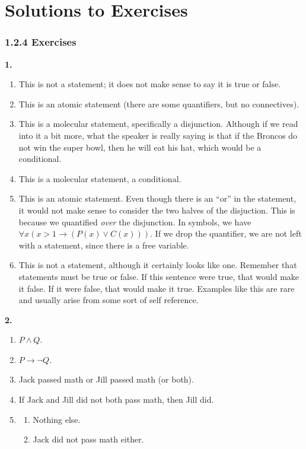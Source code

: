 \documentclass[10pt,]{book}
\theoremstyle{plain}
\theoremstyle{definition}
\theoremstyle{definition}
\theoremstyle{definition}
\numberwithin{equation}{section}
\def\imp{\rightarrow}
\begin{document}
\chapter[Solutions to Exercises]{Solutions to Exercises}\label{appendix-1}
\subsection*{1.2.4 Exercises}
\noindent\textbf{1.}\quad{}\leavevmode%
\begin{enumerate}[label=(\alph*)]
\item\hypertarget{li-67}{}This is not a statement; it does not make sense to say it is true or false.%
\item\hypertarget{li-68}{}This is an atomic statement (there are some quantifiers, but no connectives).%
\item\hypertarget{li-69}{}This is a molecular statement, specifically a disjunction.  Although if we read into it a bit more, what the speaker is really saying is that if the Broncos do not win the super bowl, then he will eat his hat, which would be a conditional.%
\item\hypertarget{li-70}{}This is a molecular statement, a conditional.%
\item\hypertarget{li-71}{}This is an atomic statement.  Even though there is an ``or'' in the statement, it would not make sense to consider the two halves of the disjuction.  This is because we quantified \emph{over} the disjunction.  In symbols, we have \(\forall x (x > 1 \imp (P(x) \vee C(x)))\).  If we drop the quantifier, we are not left with a statement, since there is a free variable.%
\item\hypertarget{li-72}{}This is not a statement, although it certainly looks like one.  Remember that statements must be true or false.  If this sentence were true, that would make it false.  If it were false, that would make it true.  Examples like this are rare and usually arise from some sort of self reference.%
\end{enumerate}
\par\smallskip
\noindent\textbf{2.}\quad{}\leavevmode%
\begin{enumerate}[label=(\alph*)]
\item\hypertarget{li-80}{}\(P \wedge Q\).%
\item\hypertarget{li-81}{}\(P \imp \neg Q\).%
\item\hypertarget{li-82}{}
    Jack passed math or Jill passed math (or both).
\item\hypertarget{li-83}{}
    If Jack and Jill did not both pass math, then Jill did.
\item\hypertarget{li-84}{}
\begin{enumerate}[label=\roman*.]
\item\hypertarget{li-85}{} Nothing else. %
\item\hypertarget{li-86}{} Jack did not pass math either.%
\end{enumerate}

\end{enumerate}
\end{document}
